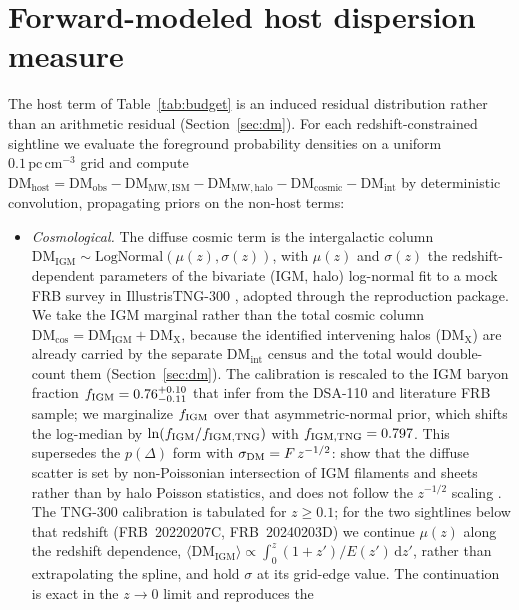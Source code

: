 \clearpage
\FloatBarrier

\section{Forward-modeled host dispersion measure}
\label{app:host-forward-model}

The host term of Table~\ref{tab:budget} is an induced residual distribution rather
than an arithmetic residual (Section~\ref{sec:dm}). For each redshift-constrained
sightline we evaluate the foreground probability densities on a uniform
$0.1\,\mathrm{pc\,cm^{-3}}$ grid and compute
$\mathrm{DM_{host}}=\mathrm{DM_{obs}}-\mathrm{DM_{MW,ISM}}-\mathrm{DM_{MW,halo}}
-\mathrm{DM_{cosmic}}-\mathrm{DM_{int}}$ by deterministic convolution,
propagating priors on the non-host terms:
\begin{itemize}
\item \emph{Cosmological.} The diffuse cosmic term is the intergalactic column
$\mathrm{DM_{IGM}}\sim\mathrm{LogNormal}(\mu(z),\sigma(z))$, with $\mu(z)$ and
$\sigma(z)$ the redshift-dependent parameters of the bivariate (IGM, halo)
log-normal fit to a mock FRB survey in IllustrisTNG-300 \citep{Walker2024},
adopted through the \citet{Connor2024} reproduction package. We take the IGM
marginal rather than the total cosmic column
$\mathrm{DM_{cos}}=\mathrm{DM_{IGM}}+\mathrm{DM_X}$, because the identified
intervening halos ($\mathrm{DM_X}$) are already carried by the separate
$\mathrm{DM_{int}}$ census and the total would double-count them
(Section~\ref{sec:dm}). The calibration is rescaled to the IGM baryon fraction
$f_{\rm IGM}=0.76^{+0.10}_{-0.11}$ that \citet{Connor2024} infer from the
DSA-110 and literature FRB sample; we marginalize $f_{\rm IGM}$ over that
asymmetric-normal prior, which shifts the log-median by
$\ln(f_{\rm IGM}/f_{\rm IGM,TNG})$ with $f_{\rm IGM,TNG}=0.797$. This supersedes
the \citet{Macquart2020} $p(\Delta)$ form with $\sigma_{\rm DM}=F\,z^{-1/2}$:
\citet{Connor2024} show that the diffuse scatter is set by non-Poissonian
intersection of IGM filaments and sheets rather than by halo Poisson statistics,
and does not follow the $z^{-1/2}$ scaling \citep{McQuinn2014, James2022}. The
TNG-300 calibration is tabulated for $z\ge0.1$; for the two sightlines below
that redshift (FRB~20220207C, FRB~20240203D) we continue $\mu(z)$ along the
\citet{Macquart2020} redshift dependence,
$\langle\mathrm{DM_{IGM}}\rangle\propto\int_0^z(1+z')/E(z')\,\mathrm{d}z'$,
rather than extrapolating the spline, and hold $\sigma$ at its grid-edge value.
The continuation is exact in the $z\rightarrow0$ limit and reproduces the

\end{itemize}
